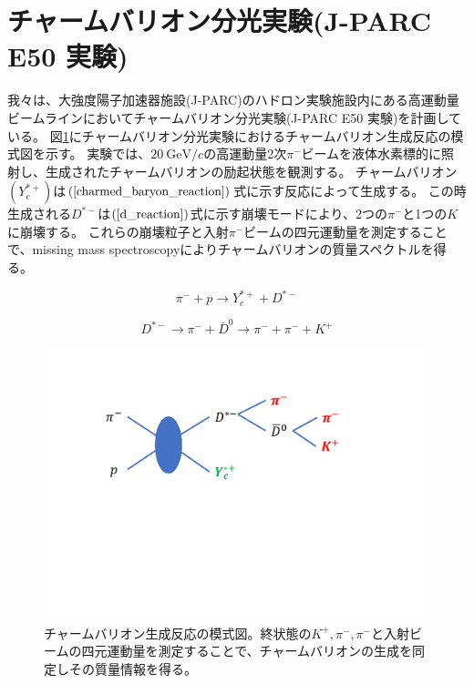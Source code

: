 \section{チャームバリオン分光実験(J-PARC E50 実験)}
我々は、大強度陽子加速器施設(J-PARC)のハドロン実験施設内にある高運動量ビームラインにおいてチャームバリオン分光実験(J-PARC E50 実験)を計画している。
図\ref{charmed_baryon_generation}にチャームバリオン分光実験におけるチャームバリオン生成反応の模式図を示す。
実験では、$\SI{20}{\GeV / c}$の高運動量2次$\pi^-$ビームを液体水素標的に照射し、生成されたチャームバリオンの励起状態を観測する。
チャームバリオン$(Y_c^{*+})$は$(\ref{charmed_baryon_reaction})$式に示す反応によって生成する。
この時生成される$D^{*-}$は$(\ref{d_reaction})$式に示す崩壊モードにより、2つの$\pi^-$と1つの$K$に崩壊する。
これらの崩壊粒子と入射$\pi^-$ビームの四元運動量を測定することで、missing mass spectroscopyによりチャームバリオンの質量スペクトルを得る。

\begin{equation}
  \label{charmed_baryon_reaction}
  \pi^- + p \rightarrow Y_c^{*+} + D^{*-}
\end{equation}

\begin{equation}
  \label{d_reaction}
  D^{*-} \rightarrow \pi^- + \bar{D}^0 \rightarrow \pi^- + \pi^- + K^+
\end{equation}

\begin{figure}[htbp]
  \label{charmed_baryon_generation}
  \centering
  \includegraphics[width=15cm]{images/chapter1/charmed_baryon_generation.pdf}
  \caption{チャームバリオン生成反応の模式図。終状態の$K^+,\pi^-,\pi^-$と入射ビームの四元運動量を測定することで、チャームバリオンの生成を同定しその質量情報を得る。}
\end{figure}
